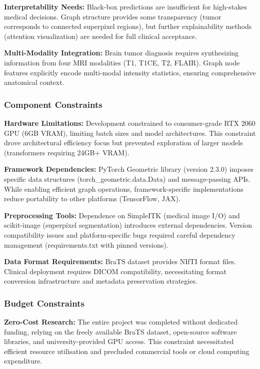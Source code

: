 \textbf{Interpretability Needs:} Black-box predictions are insufficient for high-stakes medical decisions. Graph structure provides some transparency (tumor corresponds to connected superpixel regions), but further explainability methods (attention visualization) are needed for full clinical acceptance.

\textbf{Multi-Modality Integration:} Brain tumor diagnosis requires synthesizing information from four MRI modalities (T1, T1CE, T2, FLAIR). Graph node features explicitly encode multi-modal intensity statistics, ensuring comprehensive anatomical context.

\subsubsection{Component Constraints}

\textbf{Hardware Limitations:} Development constrained to consumer-grade RTX 2060 GPU (6GB VRAM), limiting batch sizes and model architectures. This constraint drove architectural efficiency focus but prevented exploration of larger models (transformers requiring 24GB+ VRAM).

\textbf{Framework Dependencies:} PyTorch Geometric library (version 2.3.0) imposes specific data structures (torch\_geometric.data.Data) and message-passing APIs. While enabling efficient graph operations, framework-specific implementations reduce portability to other platforms (TensorFlow, JAX).

\textbf{Preprocessing Tools:} Dependence on SimpleITK (medical image I/O) and scikit-image (superpixel segmentation) introduces external dependencies. Version compatibility issues and platform-specific bugs required careful dependency management (requirements.txt with pinned versions).

\textbf{Data Format Requirements:} BraTS dataset provides NIfTI format files. Clinical deployment requires DICOM compatibility, necessitating format conversion infrastructure and metadata preservation strategies.

\subsubsection{Budget Constraints}

\textbf{Zero-Cost Research:} The entire project was completed without dedicated funding, relying on the freely available BraTS dataset, open-source software libraries, and university-provided GPU access. This constraint necessitated efficient resource utilisation and precluded commercial tools or cloud computing expenditure.

